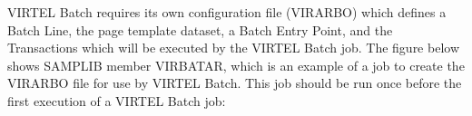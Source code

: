 \documentclass[letterpaper,10pt,english]{sphinxmanual}
\begin{document}
\begin{sphinxVerbatim}[commandchars=\\\{\}]
    
\end{sphinxVerbatim}



VIRTEL Batch requires its own configuration file (VIRARBO) which defines a Batch Line, the page template dataset, a
Batch Entry Point, and the Transactions which will be executed by the VIRTEL Batch job. The figure below shows SAMPLIB member VIRBATAR, which is an example of a job to create the VIRARBO file for use by VIRTEL Batch. This job should be run once before the first execution of a VIRTEL Batch job:
\end{document}
